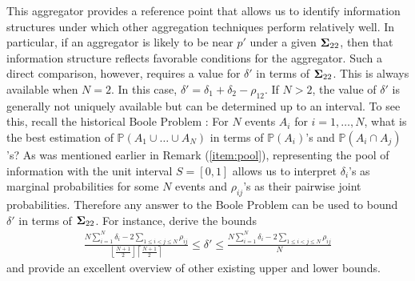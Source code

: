 \documentclass[12pt]{article}
\renewcommand{\P}{\mathbb{P}}
\theoremstyle{definition}
\theoremstyle{definition}
\def\P{{\mathbb P}}
\begin{document}
This aggregator provides a reference point that allows us to identify information structures under which other aggregation techniques perform relatively well. In particular, if an aggregator is likely to be near $p'$ under a given ${\bf\Sigma}_{22}$, then that information structure reflects favorable conditions for the aggregator. Such a direct comparison, however, requires a value for $\delta'$ in terms of ${\bf\Sigma}_{22}$. This is always available when $N = 2$. In this case, $\delta' = \delta_1 + \delta_2 - \rho_{12}$. If $N > 2$,  the value of $\delta'$ is generally not uniquely available but can be determined up to an interval. To see this, recall the historical Boole Problem \citep{boole1854investigation}: For $N$ events $A_i$ for $i = 1, \dots, N$, what is the best estimation of $\P(A_1 \cup \dots \cup A_N)$ in terms of $\P(A_i)$'s and $\P(A_i \cap A_j)$'s?
As was mentioned earlier in Remark (\ref{item:pool}), representing the pool of information with the unit interval $S = [0,1]$ allows us to interpret $\delta_i$'s as marginal probabilities for some $N$ events and $\rho_{ij}$'s as their pairwise joint probabilities. Therefore any answer to the Boole Problem can be used to bound $\delta'$ in terms of ${\bf\Sigma}_{22}$. For instance, \cite{deza1997geometry} derive the bounds
\begin{align*}
\frac{N \sum_{i=1}^N \delta_i - 2 \sum_{1 \leq i < j \leq N} \rho_{ij}}{\left\lfloor \frac{N+1}{2} \right\rfloor \left\lceil \frac{N+1}{2} \right\rceil }  \leq \delta' \leq \frac{N \sum_{i=1}^N \delta_i - 2 \sum_{1 \leq i < j \leq N} \rho_{ij}}{N} 
\end{align*}
and provide an excellent overview of other existing upper and lower bounds. 
\end{document}
